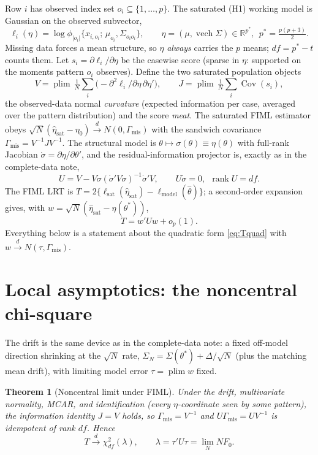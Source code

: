 \documentclass[11pt]{article}
\newcommand{\Cov}{\operatorname{Cov}}
\newcommand{\vech}{\operatorname{vech}}
\newcommand{\rank}{\operatorname{rank}}
\newcommand{\plim}{\operatorname*{plim}}
\newcommand{\Gmis}{\Gamma_{\mathrm{mis}}}
\newcommand{\dto}{\xrightarrow{d}}
\theoremstyle{plain}
\newtheorem{theorem}{Theorem}
\theoremstyle{remark}
\begin{document}
Row $i$ has observed index set $o_i\subseteq\{1,\dots,p\}$. The saturated
(H1) working model is Gaussian on the observed subvector,
\[
  \ell_i(\eta)
    = \log\phi_{|o_i|}\{x_{i,o_i};\,\mu_{o_i},\Sigma_{o_io_i}\},
  \qquad
  \eta=(\mu,\vech\Sigma)\in\mathbb{R}^{p^\ast},\ \ p^\ast=\tfrac{p(p+3)}{2}.
\]
Missing data forces a mean structure, so $\eta$ \emph{always} carries the $p$
means; $df=p^\ast-t$ counts them. Let $s_i=\partial\ell_i/\partial\eta$ be the
casewise score (sparse in $\eta$: supported on the moments pattern $o_i$
observes). Define the two saturated population objects
\[
  V = \plim\,\tfrac1N\textstyle\sum_i\big(-\partial^2\ell_i/\partial\eta\,\partial\eta'\big),
  \qquad
  J = \plim\,\tfrac1N\textstyle\sum_i \Cov(s_i),
\]
the observed-data normal \emph{curvature} (expected information per case,
averaged over the pattern distribution) and the score \emph{meat}. The saturated
FIML estimator obeys $\sqrt N(\hat\eta_{\mathrm{sat}}-\eta_0)\dto
N(0,\Gmis)$ with the sandwich covariance $\Gmis=V^{-1}JV^{-1}$. The structural
model is $\theta\mapsto\sigma(\theta)\equiv\eta(\theta)$ with full-rank Jacobian
$\dot\sigma=\partial\eta/\partial\theta'$, and the residual-information projector
is, exactly as in the complete-data note,
\begin{equation}\label{eq:U}
  U = V - V\dot\sigma(\dot\sigma'V\dot\sigma)^{-1}\dot\sigma'V,
  \qquad U\dot\sigma=0,\ \ \rank U = df .
\end{equation}
The FIML LRT is $T=2\{\ell_{\mathrm{sat}}(\hat\eta_{\mathrm{sat}})
-\ell_{\mathrm{model}}(\hat\theta)\}$; a second-order expansion gives, with
$w=\sqrt N(\hat\eta_{\mathrm{sat}}-\eta(\theta^\ast))$,
\begin{equation}\label{eq:Tquad}
  T = w'Uw + o_p(1).
\end{equation}
Everything below is a statement about the quadratic form \eqref{eq:Tquad} with
$w\dto N(\tau,\Gmis)$.

\section{Local asymptotics: the noncentral chi-square}

The drift is the same device as in the complete-data note: a fixed off-model
direction shrinking at the $\sqrt N$ rate, $\Sigma_N=\Sigma(\theta^\ast)
+\Delta/\sqrt N$ (plus the matching mean drift), with limiting model error
$\tau=\plim w$ fixed.

\begin{theorem}[Noncentral limit under FIML]\label{thm:ncp}
Under the drift, multivariate normality, MCAR, and identification (every
$\eta$-coordinate seen by some pattern), the information identity $J=V$ holds, so
$\Gmis=V^{-1}$ and $U\Gmis=UV^{-1}$ is idempotent of rank $df$. Hence
\[
  T \dto \chi^2_{df}(\lambda),
  \qquad
  \lambda = \tau'U\tau = \lim_N N F_0 .
\]
\end{theorem}
\end{document}
